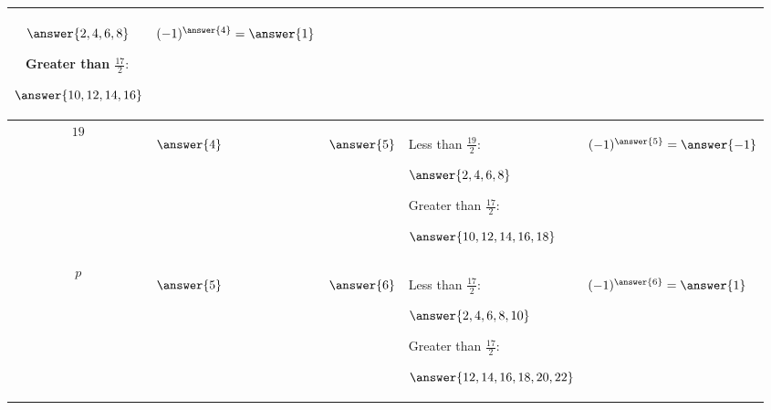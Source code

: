\documentclass{ximera}
\begin{document}
\begin{br}
\begin{tabular}{c|p{1.5cm}|p{2.5cm}|p{7cm}|p{3cm}}
{\begin{prompt}
            $\answer{2,4,6,8}$\end{prompt}
                \\Greater than $\tfrac{17}{2}:$ \begin{prompt}
            $\answer{10,12,14,16}$\end{prompt}}
                & \begin{prompt}
            $(-1)^{\answer{4}}=\answer{1}$\end{prompt}\\\hline
        $19$ & \begin{prompt}
            $\answer{4}$\end{prompt}	& \begin{prompt}
            $\answer{5}$\end{prompt}
                & \makecell[l]{Less than $\tfrac{19}{2}:$ \begin{prompt}
            $\answer{2,4,6,8}$\end{prompt}
            \\Greater than $\tfrac{17}{2}:$ \begin{prompt}
            $\answer{10,12,14,16,18}$\end{prompt}}
            & \begin{prompt}
            $(-1)^{\answer{5}}=\answer{-1}$\end{prompt}\\\hline
            $p$ & \begin{prompt}
            $\answer{5}$\end{prompt}	& \begin{prompt}
            $\answer{6}$\end{prompt}
                & \makecell[l]{Less than $\tfrac{17}{2}:$ \begin{prompt}
            $\answer{2,4,6,8,10}$\end{prompt}
                \\Greater than $\tfrac{17}{2}:$ \begin{prompt}
            $\answer{12,14,16,18,20,22}$\end{prompt}}
                & \begin{prompt}
            $(-1)^{\answer{6}}=\answer{1}$\end{prompt}\\\hline
    \end{tabular}
\end{br}
\end{document}
